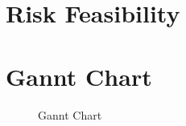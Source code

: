 \documentclass[12pt, a4paper]{article}
\begin{document}
    \section{Risk Feasibility}

    \pagebreak
    \section{Gannt Chart}

        \begin{figure}[H]\centering
                \caption{Gannt Chart}
        \end{figure}



            
\end{document}
